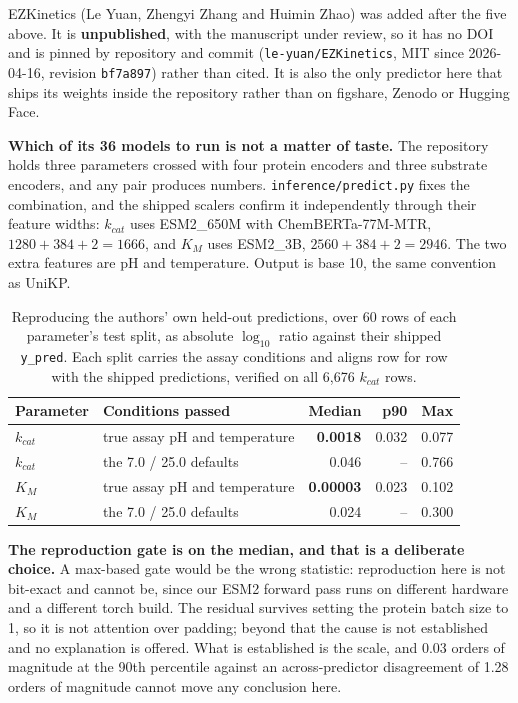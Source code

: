 EZKinetics (Le Yuan, Zhengyi Zhang and Huimin Zhao) was added after the five above. It is
\textbf{unpublished}, with the manuscript under review, so it has no DOI and is pinned by
repository and commit (\texttt{le-yuan/EZKinetics}, MIT since 2026-04-16, revision
\texttt{bf7a897}) rather than cited. It is also the only predictor here that ships its
weights inside the repository rather than on figshare, Zenodo or Hugging Face.

\textbf{Which of its 36 models to run is not a matter of taste.} The repository holds three
parameters crossed with four protein encoders and three substrate encoders, and any pair
produces numbers. \texttt{inference/predict.py} fixes the combination, and the shipped
scalers confirm it independently through their feature widths: $k_{cat}$ uses ESM2\_650M
with ChemBERTa-77M-MTR, $1280 + 384 + 2 = 1666$, and $K_M$ uses ESM2\_3B, $2560 + 384 + 2 =
2946$. The two extra features are pH and temperature. Output is base 10, the same convention
as UniKP.

\begin{table}[!htbp]
  \centering
  \footnotesize
  \caption[EZKinetics reproduction]{Reproducing the authors' own held-out predictions, over
  60 rows of each parameter's test split, as absolute $\log_{10}$ ratio against their
  shipped \texttt{y\_pred}. Each split carries the assay conditions and aligns row for row
  with the shipped predictions, verified on all 6{,}676 $k_{cat}$ rows.}
  \label{tab:ezkinetics-repro}
  \begin{tabular}{@{}llrrr@{}}
    \hline
    Parameter & Conditions passed & Median & p90 & Max \\
    \hline
    $k_{cat}$ & true assay pH and temperature & \textbf{0.0018} & 0.032 & 0.077 \\
    $k_{cat}$ & the 7.0 / 25.0 defaults & 0.046 & -- & 0.766 \\
    $K_M$ & true assay pH and temperature & \textbf{0.00003} & 0.023 & 0.102 \\
    $K_M$ & the 7.0 / 25.0 defaults & 0.024 & -- & 0.300 \\
    \hline
  \end{tabular}
\end{table}

\textbf{The reproduction gate is on the median, and that is a deliberate choice.} A
max-based gate would be the wrong statistic: reproduction here is not bit-exact and cannot
be, since our ESM2 forward pass runs on different hardware and a different torch build. The
residual survives setting the protein batch size to 1, so it is not attention over padding;
beyond that the cause is not established and no explanation is offered. What is established
is the scale, and 0.03 orders of magnitude at the 90th percentile against an across-predictor
disagreement of 1.28 orders of magnitude cannot move any conclusion here.

